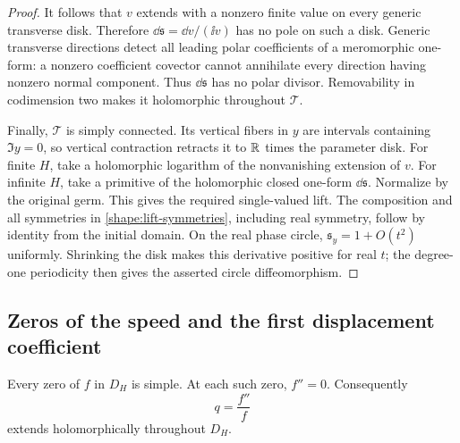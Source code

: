 \begin{proof}
It follows that \(v\) extends with a nonzero finite value on every
generic transverse disk. Therefore
\(\dd\mathfrak s=\dd v/(\ii v)\) has no pole on such a disk.
Generic transverse directions detect all leading polar coefficients
of a meromorphic one-form: a nonzero coefficient covector cannot
annihilate every direction having nonzero normal component.
Thus \(\dd\mathfrak s\) has no polar divisor. Removability in
codimension two makes it holomorphic throughout \(\mathcal T\).

Finally, \(\mathcal T\) is simply connected. Its vertical fibers in
\(y\) are intervals containing \(\Im y=0\), so vertical contraction
retracts it to \(\mathbb R\) times the parameter disk. For finite \(H\),
take a holomorphic logarithm of the nonvanishing extension of \(v\).
For infinite \(H\), take a primitive of the holomorphic closed
one-form \(\dd\mathfrak s\). Normalize by the original germ. This
gives the required single-valued lift. The composition and all
symmetries in \eqref{shape:lift-symmetries}, including real symmetry,
follow by identity from the initial domain. On the real phase circle,
\(\mathfrak s_y=1+O(t^2)\) uniformly. Shrinking the disk makes this
derivative positive for real \(t\); the degree-one periodicity then
gives the asserted circle diffeomorphism.
\end{proof}

\subsection{Zeros of the speed and the first displacement coefficient}

\begin{lemma}
\label{lem:f-zeros}
Every zero of \(f\) in \(D_H\) is simple. At each such zero,
\(f''=0\). Consequently
\begin{equation}
 q=\frac{f''}{f}
 \label{shape:potential-definition}
\end{equation}
extends holomorphically throughout \(D_H\).
\end{lemma}

